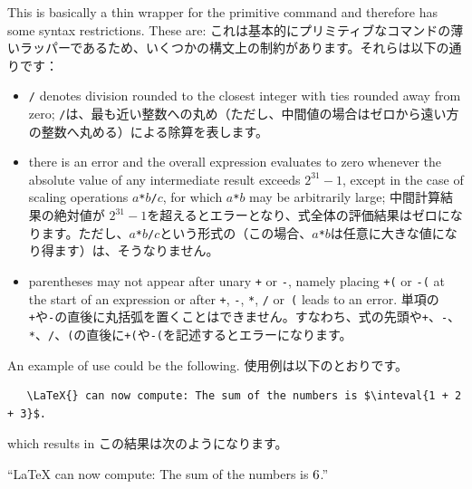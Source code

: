 \documentclass{ltxguide}
\newcommand\jpnewline{\vspace{3pt}\newline}
\begin{document}
  This is basically a thin wrapper for the primitive 
  command and therefore has some syntax restrictions. These are:
  \jpnewline
  これは基本的にプリミティブなコマンドの薄いラッパーであるため、いくつかの構文上の制約があります。それらは以下の通りです：
  \begin{itemize}
  \item \texttt{/} denotes division rounded to the closest integer with
    ties rounded away from zero;
    \jpnewline
     \texttt{/}は、最も近い整数への丸め（ただし、中間値の場合はゼロから遠い方の整数へ丸める）による除算を表します。
  \item there is an error and the overall expression evaluates to zero
    whenever the absolute value of any intermediate result exceeds
    $2^{31}-1$, except in the case of scaling operations
    $a$\texttt{*}$b$\texttt{/}$c$, for which $a$\texttt{*}$b$ may be
    arbitrarily large;
    \jpnewline
    中間計算結果の絶対値が $2^{31}-1$を超えるとエラーとなり、式全体の評価結果はゼロになります。ただし、$a$\texttt{*}$b$\texttt{/}$c$という形式の（この場合、$a$\texttt{*}$b$は任意に大きな値になり得ます）は、そうなりません。
  \item parentheses may not appear after unary \texttt{+} or
    \texttt{-}, namely placing \texttt{+(} or \texttt{-(} at the start
    of an expression or after \texttt{+}, \texttt{-}, \texttt{*},
    \texttt{/} or~\texttt{(} leads to an error.
 \jpnewline   
    単項の\texttt{+}や\texttt{-}の直後に丸括弧を置くことはできません。すなわち、式の先頭や\texttt{+}、\texttt{-}、\texttt{*}、\texttt{/}、\texttt{(}の直後に\texttt{+(}や\texttt{-(}を記述するとエラーになります。
  \end{itemize}

An example of use could be the following.
\jpnewline
使用例は以下のとおりです。
\begin{verbatim}
   \LaTeX{} can now compute: The sum of the numbers is $\inteval{1 + 2 + 3}$.
\end{verbatim}
which results in
\jpnewline
この結果は次のようになります。

\enquote{\LaTeX{} can now compute: The sum of the numbers is $\inteval{1 + 2 + 3}$.}
\end{document}
